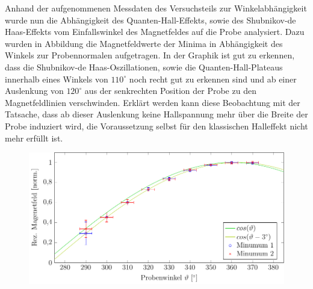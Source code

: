 

Anhand der aufgenommenen Messdaten des Versuchsteils zur Winkelabhängigkeit wurde nun die Abhängigkeit des Quanten-Hall-Effekts, sowie des Shubnikov-de Haas-Effekts vom Einfallswinkel des Magnetfeldes auf die Probe analysiert.
Dazu wurden in Abbildung %
die Magnetfeldwerte der Minima in Abhängigkeit des Winkels zur Probennormalen aufgetragen. 
In der Graphik ist gut zu erkennen, dass die Shubnikov-de Haas-Oszillationen, sowie die Quanten-Hall-Plateaus innerhalb eines Winkels von $110^\circ$
noch recht gut zu erkennen sind und ab einer Auslenkung von $120^\circ$
aus der senkrechten Position der Probe zu den Magnetfeldlinien verschwinden. Erklärt werden kann diese Beobachtung mit der Tatsache, dass ab dieser Auslenkung keine Hallspannung mehr über die Breite der Probe induziert wird, die Voraussetzung selbst für den klassischen Halleffekt nicht mehr erfüllt ist.  %


\begin{figure}[h]
	\centering
	\includegraphics[scale=1]{graphs/winkel/auswertung.pdf}
	\caption[]{
		}
		\label{fig:winkel_ausw}
\end{figure}

